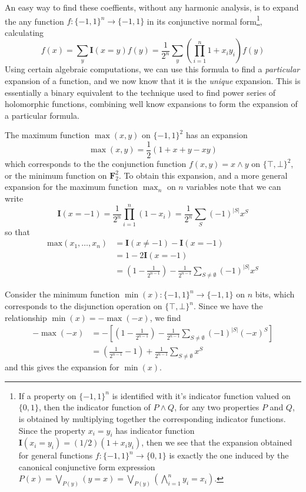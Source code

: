 An easy way to find these coeffients, without any harmonic analysis, is to expand the any function $f: \{ -1, 1 \}^n \to \{ -1, 1 \}$ in its conjunctive normal form\footnote{If a property on $\{ -1, 1 \}^n$ is identified with it's indicator function valued on $\{ 0, 1 \}$, then the indicator function of $P \wedge Q$, for any two properties $P$ and $Q$, is obtained by multiplying together the corresponding indicator functions. Since the property $x_i = y_i$ has indicator function $\mathbf{I}(x_i = y_i) = (1/2)(1 + x_iy_i)$, then we see that the expansion obtained for general functions $f: \{ -1, 1 \}^n \to \{ 0, 1 \}$ is exactly the one induced by the canonical conjunctive form expression $P(x) = \bigvee_{P(y)} (y = x) = \bigvee_{P(y)} \left( \bigwedge_{i = 1}^n y_i = x_i \right)$.}, calculating
%
\[ f(x) = \sum_y \mathbf{I}(x = y) f(y) = \frac{1}{2^n} \sum_y \left( \prod_{i = 1}^n 1 + x_iy_i \right) f(y) \]
%
Using certain algebraic computations, we can use this formula to find a {\it particular} expansion of a function, and we now know that it is the {\it unique} expansion. This is essentially a binary equivalent to the technique used to find power series of holomorphic functions, combining well know expansions to form the expansion of a particular formula.

\begin{example}
    The maximum function $\max(x,y)$ on $\{ -1, 1 \}^2$ has an expansion
    \[ \max(x,y) = \frac{1}{2} \left( 1 + x + y - xy \right) \]
    which corresponds to the the conjunction function $f(x,y) = x \wedge y$ on $\{ \top, \bot \}^2$, or the minimum function on $\mathbf{F}_2^2$. To obtain this expansion, and a more general expansion for the maximum function $\max_n$ on $n$ variables note that we can write
    \[ \mathbf{I}(x = -1) = \frac{1}{2^n} \prod_{i = 1}^n (1 - x_i) = \frac{1}{2^n} \sum_S (-1)^{|S|} x^S \]
    so that
    \begin{align*}
        \text{max}(x_1, \dots, x_n) &= \mathbf{I}(x \neq -1) - \mathbf{I}(x = -1)\\
        &= 1 - 2 \mathbf{I}(x = -1)\\
        &= \left(1 - \frac{1}{2^{n-1}} \right) - \frac{1}{2^{n-1}} \sum_{S \neq \emptyset} (-1)^{|S|} x^S
    \end{align*}
\end{example}

\begin{example}
    Consider the minimum function $\min(x): \{ -1, 1 \}^n \to \{ -1, 1 \}$ on $n$ bits, which corresponds to the disjunction operation on $\{ \top, \bot \}^n$. Since we have the relationship $\min(x) = - \max(-x)$, we find
    \begin{align*}
        -\max(-x) &= - \left[ \left(1 - \frac{1}{2^{n-1}} \right) - \frac{1}{2^{n-1}} \sum_{S \neq \emptyset} (-1)^{|S|} (-x)^S \right]\\
        &= \left( \frac{1}{2^{n-1}} - 1 \right) + \frac{1}{2^{n-1}} \sum_{S \neq \emptyset} x^S
    \end{align*}
    and this gives the expansion for $\min(x)$.
\end{example}

